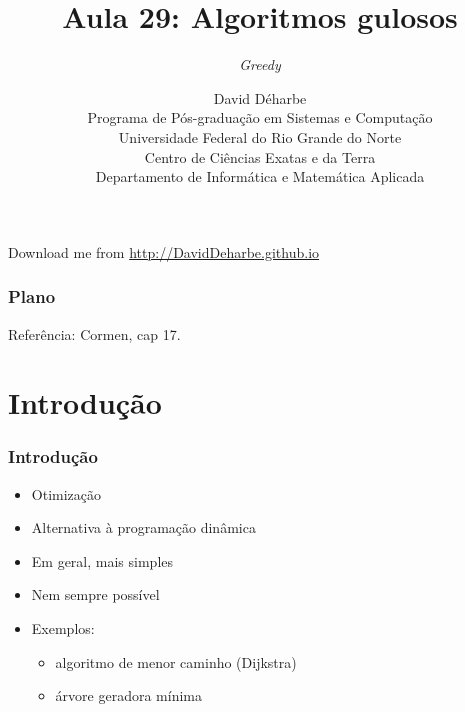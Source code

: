 \documentclass{beamer}
\title{Aula 29: Algoritmos gulosos}
\subtitle{\textit{Greedy}}
\author{David Déharbe \\
  Programa de Pós-graduação em Sistemas e Computação \\
  Universidade Federal do Rio Grande do Norte \\
  Centro de Ciências Exatas e da Terra \\
  Departamento de Informática e Matemática Aplicada}
\date{}
\begin{document}


\begin{frame}
  \titlepage

  Download me from \url{http://DavidDeharbe.github.io}
\end{frame}

\begin{frame}
  \frametitle{Plano}

  \tableofcontents
Referência: Cormen, cap 17.
\end{frame}

\section{Introdução}


\begin{frame}
\frametitle{Introdução}

\begin{itemize}

\item Otimização

\item Alternativa à programação dinâmica

\item Em geral, mais simples

\item Nem sempre possível

\item Exemplos:

\begin{itemize}

\item algoritmo de menor caminho (Dijkstra)

\item árvore geradora mínima

\end{itemize}

\end{itemize}

\end{frame}

\end{document}
